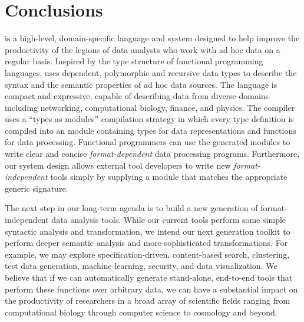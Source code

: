 \section{Conclusions}
\label{sec:future}

\padsml{} is a high-level, domain-specific language and system
designed to help improve the productivity of the legions of data analysts
who work with ad hoc data on a regular basis.  
Inspired by the type structure of functional
programming languages, \padsml{} uses dependent,
polymorphic and recursive data types to describe the syntax and 
the semantic properties of ad hoc data sources.  The language 
is compact and expressive, capable of describing data from diverse 
domains including networking, computational biology, finance, and physics. 
The \padsml{} compiler uses a ``types as modules'' compilation strategy
in which every \padsml{} type definition is compiled into
an \ocaml{} module containing types for data representations
and functions for data processing.  Functional programmers
can use the generated modules to write clear and concise {\em format-dependent}
data processing programs.  Furthermore, our system design
allows external tool developers to write new {\em format-independent} tools
simply by supplying a module that matches the appropriate generic
signature.  

The next step in our long-term agenda is to build a new generation of
format-independent data analysis tools.  While our current tools
perform some simple syntactic analysis and transformation, we intend
our next generation toolkit to perform deeper semantic analysis and
more sophisticated transformations.  For example, we may explore
specification-driven, content-based search, clustering, test data
generation, machine learning, security, and data visualization.  We
believe that if we can automatically generate stand-alone, end-to-end
tools that perform these functions over arbitrary data, we can have a
substantial impact on the productivity of researchers in a broad array
of scientific fields ranging from computational biology through
computer science to cosmology and beyond.
